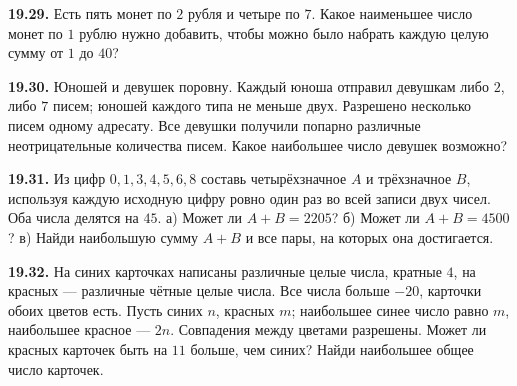 \noindent\begin{minipage}[t]{\linewidth}\textbf{19.29.}\starmark{} Есть пять монет по \(2\) рубля и четыре по \(7\). Какое наименьшее число монет по \(1\) рублю нужно добавить, чтобы можно было набрать каждую целую сумму от \(1\) до \(40\)?\par\end{minipage}\par
\noindent\begin{minipage}[t]{\linewidth}\textbf{19.30.}\starmark{} Юношей и девушек поровну. Каждый юноша отправил девушкам либо \(2\), либо \(7\) писем; юношей каждого типа не меньше двух. Разрешено несколько писем одному адресату. Все девушки получили попарно различные неотрицательные количества писем. Какое наибольшее число девушек возможно?\par\end{minipage}\par
\noindent\begin{minipage}[t]{\linewidth}\textbf{19.31.}\starmark{} Из цифр \(0,1,3,4,5,6,8\) составь четырёхзначное \(A\) и трёхзначное \(B\), используя каждую исходную цифру ровно один раз во всей записи двух чисел. Оба числа делятся на \(45\). а) Может ли \(A+B=2205\)? б) Может ли \(A+B=4500\)? в) Найди наибольшую сумму \(A+B\) и все пары, на которых она достигается.\par\end{minipage}\par
\noindent\begin{minipage}[t]{\linewidth}\textbf{19.32.}\starmark{} На синих карточках написаны различные целые числа, кратные \(4\), на красных --- различные чётные целые числа. Все числа больше \(-20\), карточки обоих цветов есть. Пусть синих \(n\), красных \(m\); наибольшее синее число равно \(m\), наибольшее красное --- \(2n\). Совпадения между цветами разрешены. Может ли красных карточек быть на \(11\) больше, чем синих? Найди наибольшее общее число карточек.\par\end{minipage}\par
\endgroup

